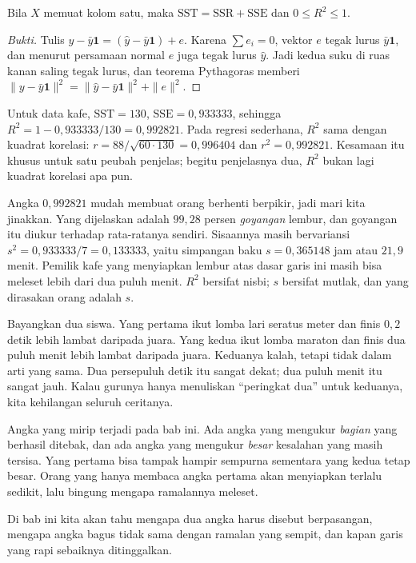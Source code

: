 \begin{teorema}
Bila $X$ memuat kolom satu, maka $\mathrm{SST}=\mathrm{SSR}+\mathrm{SSE}$ dan
$0\le R^2\le1$.
\end{teorema}

\begin{proof}[Bukti]
Tulis $y-\bar y\mathbf{1}=(\hat y-\bar y\mathbf{1})+e$. Karena $\sum e_i=0$, vektor $e$
tegak lurus $\bar y\mathbf{1}$, dan menurut persamaan normal $e$ juga tegak lurus
$\hat y$. Jadi kedua suku di ruas kanan saling tegak lurus, dan teorema Pythagoras
memberi $\|y-\bar y\mathbf{1}\|^2=\|\hat y-\bar y\mathbf{1}\|^2+\|e\|^2$.
\end{proof}

Untuk data kafe, $\mathrm{SST}=130$, $\mathrm{SSE}=0{,}933333$, sehingga
$R^2=1-0{,}933333/130=0{,}992821$. Pada regresi sederhana, $R^2$ sama dengan kuadrat
korelasi: $r=88/\sqrt{60\cdot130}=0{,}996404$ dan $r^2=0{,}992821$. Kesamaan itu
khusus untuk satu peubah penjelas; begitu penjelasnya dua, $R^2$ bukan lagi kuadrat
korelasi apa pun.

Angka $0{,}992821$ mudah membuat orang berhenti berpikir, jadi mari kita jinakkan. Yang
dijelaskan adalah $99{,}28$ persen \emph{goyangan} lembur, dan goyangan itu diukur
terhadap rata-ratanya sendiri. Sisaannya masih bervariansi $s^2=0{,}933333/7=0{,}133333$,
yaitu simpangan baku $s=0{,}365148$ jam atau $21{,}9$ menit. Pemilik kafe yang menyiapkan
lembur atas dasar garis ini masih bisa meleset lebih dari dua puluh menit. $R^2$ bersifat
nisbi; $s$ bersifat mutlak, dan yang dirasakan orang adalah $s$.

\begin{untukanak}
Bayangkan dua siswa. Yang pertama ikut lomba lari seratus meter dan finis $0{,}2$
detik lebih lambat daripada juara. Yang kedua ikut lomba maraton dan finis dua puluh
menit lebih lambat daripada juara. Keduanya kalah, tetapi tidak dalam arti yang sama.
Dua persepuluh detik itu sangat dekat; dua puluh menit itu sangat jauh. Kalau gurunya
hanya menuliskan ``peringkat dua'' untuk keduanya, kita kehilangan seluruh ceritanya.

Angka yang mirip terjadi pada bab ini. Ada angka yang mengukur \emph{bagian} yang
berhasil ditebak, dan ada angka yang mengukur \emph{besar} kesalahan yang masih
tersisa. Yang pertama bisa tampak hampir sempurna sementara yang kedua tetap besar.
Orang yang hanya membaca angka pertama akan menyiapkan terlalu sedikit, lalu bingung
mengapa ramalannya meleset.

Di bab ini kita akan tahu mengapa dua angka harus disebut berpasangan, mengapa angka
bagus tidak sama dengan ramalan yang sempit, dan kapan garis yang rapi sebaiknya
ditinggalkan.
\end{untukanak}

